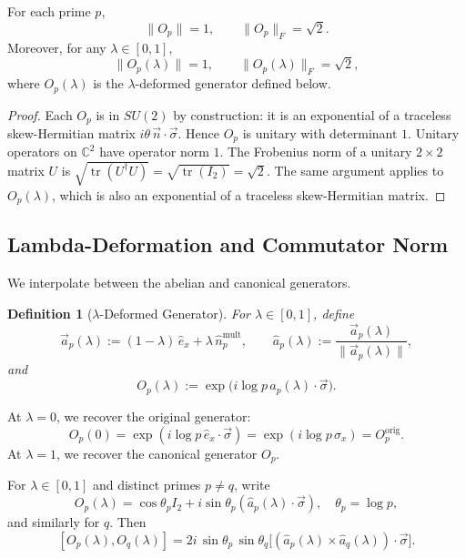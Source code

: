 \documentclass[11pt]{article}
\newtheorem{definition}[theorem]{Definition}
\theoremstyle{remark}
\begin{document}
\begin{lemma}
For each prime $p$,
\[
  \|O_p\| = 1,\qquad \|O_p\|_F = \sqrt{2}.
\]
Moreover, for any $\lambda\in[0,1]$,
\[
  \|O_p(\lambda)\| = 1,\qquad \|O_p(\lambda)\|_F = \sqrt{2},
\]
where $O_p(\lambda)$ is the $\lambda$-deformed generator defined below.
\end{lemma}

\begin{proof}
Each $O_p$ is in $SU(2)$ by construction: it is an exponential of a traceless
skew-Hermitian matrix $i\theta\,\vec{n}\cdot\vec{\sigma}$. Hence $O_p$ is
unitary with determinant $1$. Unitary operators on $\mathbb{C}^2$ have
operator norm $1$. The Frobenius norm of a unitary $2\times 2$ matrix $U$ is
$\sqrt{\operatorname{tr}(U^\dagger U)}=\sqrt{\operatorname{tr}(I_2)}=\sqrt{2}$.
The same argument applies to $O_p(\lambda)$, which is also an exponential of a
traceless skew-Hermitian matrix.
\end{proof}

\subsection{Lambda-Deformation and Commutator Norm}

We interpolate between the abelian and canonical generators.

\begin{definition}[$\lambda$-Deformed Generator]
For $\lambda\in[0,1]$, define
\[
  \vec{a}_p(\lambda)
  := (1-\lambda)\,\hat{e}_x + \lambda\,\hat{n}_p^{\mathrm{mult}},
  \qquad
  \hat{a}_p(\lambda)
  := \frac{\vec{a}_p(\lambda)}{\|\vec{a}_p(\lambda)\|},
\]
and
\[
  O_p(\lambda)
  := \exp\!\bigl(i\log p\,\hat{a}_p(\lambda)\cdot\vec{\sigma}\bigr).
\]
\end{definition}

At $\lambda=0$, we recover the original generator:
\[
  O_p(0) = \exp(i\log p\,\hat{e}_x\cdot\vec{\sigma})
         = \exp(i\log p\,\sigma_x) = O_p^{\mathrm{orig}}.
\]
At $\lambda=1$, we recover the canonical generator $O_p$.

\begin{lemma}
For $\lambda\in[0,1]$ and distinct primes $p\ne q$, write
\[
  O_p(\lambda) = \cos\theta_p I_2 +
  i\sin\theta_p(\hat{a}_p(\lambda)\cdot\vec{\sigma}),\quad
  \theta_p = \log p,
\]
and similarly for $q$. Then
\[
  [O_p(\lambda),O_q(\lambda)]
  = 2i\,\sin\theta_p\,\sin\theta_q
    \bigl[(\hat{a}_p(\lambda)\times\hat{a}_q(\lambda))
      \cdot\vec{\sigma}\bigr].
\]
\end{lemma}
\end{document}
